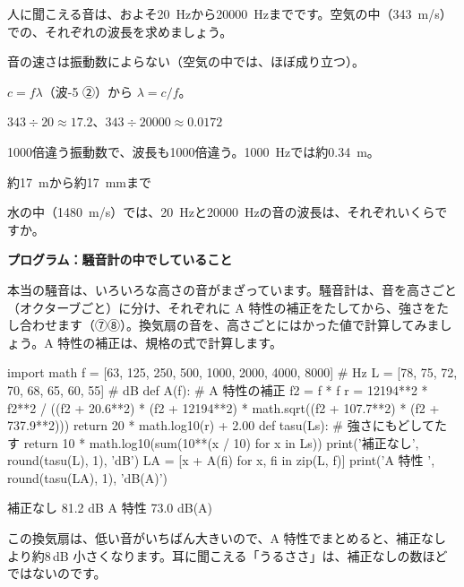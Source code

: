 \begin{reidai}[聞こえる音の波長]
\label{ph:波-9:ex15}人に聞こえる音は、およそ\qty{20}{Hz}から\qty{20000}{Hz}までです。空気の中（\qty{343}{m/s}）での、それぞれの波長を求めましょう。
\par{} 音の速さは振動数によらない（空気の中では、ほぼ成り立つ）。
\par\kangaekata $c=f\lambda$（波-5 ②）から $\lambda=c/f$。
\par\shiki $343\div20\approx17.2$、$343\div\num{20000}\approx0.0172$
\par{} 1000倍違う振動数で、波長も1000倍違う。\qty{1000}{Hz}では約\qty{0.34}{m}。
\par\kotae 約\qty{17}{m}から約\qty{17}{mm}まで
\end{reidai}
\begin{jibun}
水の中（\qty{1480}{m/s}）では、\qty{20}{Hz}と\qty{20000}{Hz}の音の波長は、それぞれいくらですか。
\end{jibun}

\noindent\textbf{プログラム：騒音計の中でしていること}\par\nobreak
本当の騒音は、いろいろな高さの音がまざっています。騒音計は、音を高さごと（オクターブごと）に分け、それぞれに A 特性の補正をたしてから、強さをたし合わせます（⑦⑧）。換気扇の音を、高さごとにはかった値で計算してみましょう。A 特性の補正は、規格の式で計算します。
\begin{phcode}[Python]
import math
f = [63, 125, 250, 500, 1000, 2000, 4000, 8000]  \# Hz
L = [78, 75, 72, 70, 68, 65, 60, 55]              \# dB
def A(f):                       \# A 特性の補正
    f2 = f * f
    r = 12194**2 * f2**2 / ((f2 + 20.6**2) * (f2 + 12194**2)
        * math.sqrt((f2 + 107.7**2) * (f2 + 737.9**2)))
    return 20 * math.log10(r) + 2.00
def tasu(Ls):                   \# 強さにもどしてたす
    return 10 * math.log10(sum(10**(x / 10) for x in Ls))
print('補正なし', round(tasu(L), 1), 'dB')
LA = [x + A(fi) for x, fi in zip(L, f)]
print('A 特性 ', round(tasu(LA), 1), 'dB(A)')
\end{phcode}
\begin{phcodeout}
補正なし 81.2 dB
A 特性  73.0 dB(A)
\end{phcodeout}
この換気扇は、低い音がいちばん大きいので、A 特性でまとめると、補正なしより約8\,dB 小さくなります。耳に聞こえる「うるささ」は、補正なしの数ほどではないのです。


